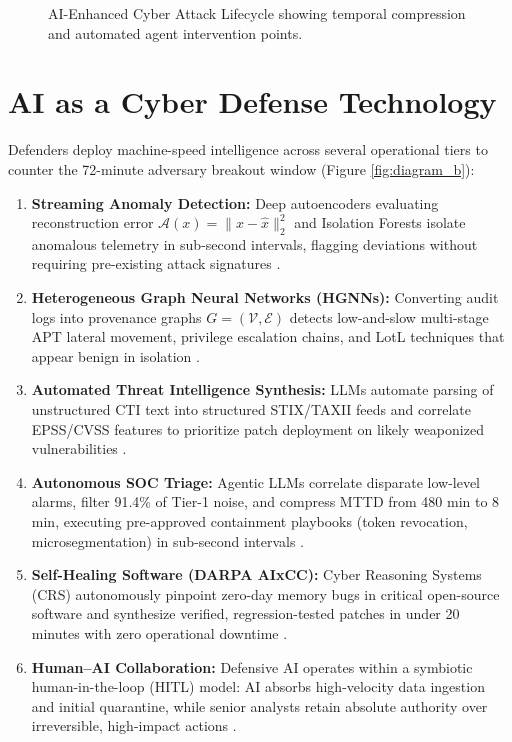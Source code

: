 \documentclass[conference,10pt,twocolumn,a4paper]{IEEEtran}
\begin{document}
\begin{figure}[t]
{
}
\caption{AI-Enhanced Cyber Attack Lifecycle showing temporal compression and automated agent intervention points.}
\label{fig:diagram_a}
\end{figure}

\section{AI as a Cyber Defense Technology}
\label{sec:defense}
Defenders deploy machine-speed intelligence across several operational tiers to counter the 72-minute adversary breakout window (Figure \ref{fig:diagram_b}):
\begin{enumerate}
    \item \textbf{Streaming Anomaly Detection:} Deep autoencoders evaluating reconstruction error $\mathcal{A}(x) = \|x - \hat{x}\|_2^2$ and Isolation Forests isolate anomalous telemetry in sub-second intervals, flagging deviations without requiring pre-existing attack signatures \cite{mirsky2018kitsune, nist_sp_ai_100_2e2025}.
    \item \textbf{Heterogeneous Graph Neural Networks (HGNNs):} Converting audit logs into provenance graphs $G=(\mathcal{V},\mathcal{E})$ detects low-and-slow multi-stage APT lateral movement, privilege escalation chains, and LotL techniques that appear benign in isolation \cite{jiang2024provenance}.
    \item \textbf{Automated Threat Intelligence Synthesis:} LLMs automate parsing of unstructured CTI text into structured STIX/TAXII feeds and correlate EPSS/CVSS features to prioritize patch deployment on likely weaponized vulnerabilities \cite{cisa_agentic_ai_2026}.
    \item \textbf{Autonomous SOC Triage:} Agentic LLMs correlate disparate low-level alarms, filter 91.4\% of Tier-1 noise, and compress MTTD from 480 min to 8 min, executing pre-approved containment playbooks (token revocation, microsegmentation) in sub-second intervals \cite{cisa_agentic_ai_2026, nist_ir_8596_2025}.
    \item \textbf{Self-Healing Software (DARPA AIxCC):} Cyber Reasoning Systems (CRS) autonomously pinpoint zero-day memory bugs in critical open-source software and synthesize verified, regression-tested patches in under 20 minutes with zero operational downtime \cite{darpa_aixcc_2025}.
    \item \textbf{Human--AI Collaboration:} Defensive AI operates within a symbiotic human-in-the-loop (HITL) model: AI absorbs high-velocity data ingestion and initial quarantine, while senior analysts retain absolute authority over irreversible, high-impact actions \cite{cisa_agentic_ai_2026, nist_ir_8596_2025}.
\end{enumerate}
\end{document}
